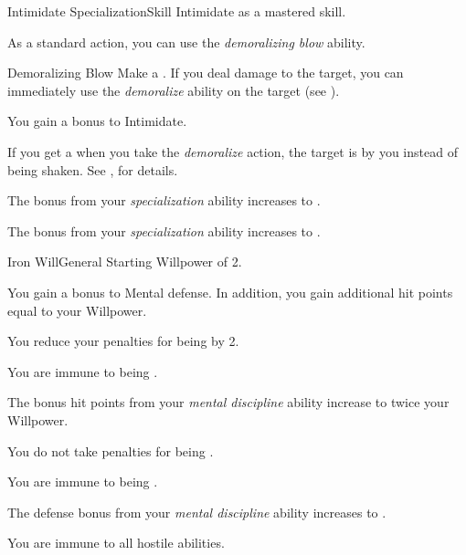     \begin{feat}{Intimidate Specialization}{Skill}
        \featpre Intimidate as a mastered skill.

         As a standard action, you can use the \textit{demoralizing blow} ability.
        \begin{ability}{Demoralizing Blow}
            Make a .
            If you deal damage to the target, you can immediately use the \textit{demoralize} ability on the target (see ).
        \end{ability}

         You gain a  bonus to Intimidate.

         If you get a  when you take the \textit{demoralize} action, the target is \frightened by you instead of being shaken.
        See , for details.

         The bonus from your \textit{specialization} ability increases to .

         The bonus from your \textit{specialization} ability increases to .
    \end{feat}

    \begin{feat}{Iron Will}{General}
        \featpre Starting Willpower of 2.

         You gain a  bonus to Mental defense.
        In addition, you gain additional hit points equal to your Willpower.

         You reduce your penalties for being  by 2.

         You are immune to being .

         The bonus hit points from your \textit{mental discipline} ability increase to twice your Willpower.

         You do not take penalties for being .

         You are immune to being .

         The defense bonus from your \textit{mental discipline} ability increases to .

         You are immune to all hostile  abilities.
    \end{feat}

